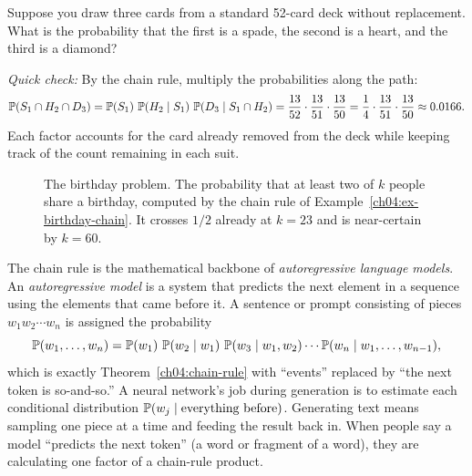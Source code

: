 \begin{recoverybox}
Suppose you draw three cards from a standard 52-card deck without replacement. What is the probability that the first is a spade, the second is a heart, and the third is a diamond?
\vspace{0.4em}

\emph{Quick check:} By the chain rule, multiply the probabilities along the path:
\[
\operatorname{\mathbb{P}}(S_1 \cap H_2 \cap D_3)
= \operatorname{\mathbb{P}}(S_1)\,\operatorname{\mathbb{P}}(H_2 \mid S_1)\,\operatorname{\mathbb{P}}(D_3 \mid S_1 \cap H_2)
= \frac{13}{52} \cdot \frac{13}{51} \cdot \frac{13}{50}
= \frac{1}{4} \cdot \frac{13}{51} \cdot \frac{13}{50}
\approx 0.0166.
\]
Each factor accounts for the card already removed from the deck while keeping track of the count remaining in each suit.
\end{recoverybox}

\begin{figure}[H]
\centering
{}
\caption{The birthday problem. The probability that at least two of $k$ people share a birthday, computed by the chain rule of Example~\ref{ch04:ex-birthday-chain}. It crosses $1/2$ already at $k=23$ and is near-certain by $k=60$.}
\label{ch04:fig-birthday}
\end{figure}

\begin{connectionbox}
The chain rule is the mathematical backbone of \emph{autoregressive language models}. An \emph{autoregressive model} is a system that predicts the next element in a sequence using the elements that came before it. A sentence or prompt consisting of pieces $w_1 w_2 \cdots w_n$ is assigned the probability
\[
\operatorname{\mathbb{P}}(w_1,\dots,w_n) = \operatorname{\mathbb{P}}(w_1)\,\operatorname{\mathbb{P}}(w_2\mid w_1)\,\operatorname{\mathbb{P}}(w_3\mid w_1,w_2)\cdots\operatorname{\mathbb{P}}(w_n \mid w_1,\dots,w_{n-1}),
\]
which is exactly Theorem~\ref{ch04:chain-rule} with ``events'' replaced by ``the next token is so-and-so.'' A neural network's job during generation is to estimate each conditional distribution $\operatorname{\mathbb{P}}(w_j \mid \text{everything before})$. Generating text means sampling one piece at a time and feeding the result back in. When people say a model ``predicts the next token'' (a word or fragment of a word), they are calculating one factor of a chain-rule product.
\end{connectionbox}

